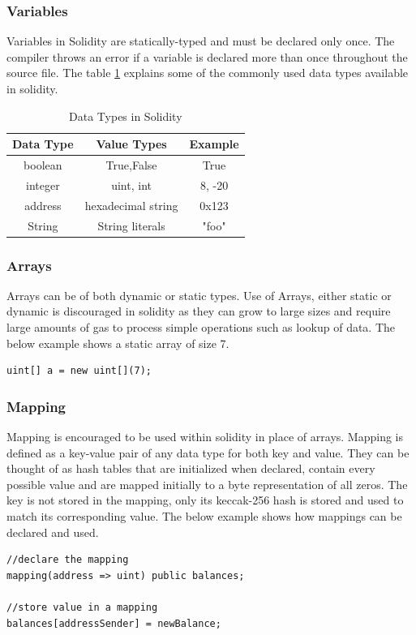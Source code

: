 \documentclass[11pt,openright]{report}
\begin{document}
\subsubsection{Variables}
Variables in Solidity are statically-typed and must be declared only once. The compiler throws an error if a variable is declared more than once throughout the source file. The table \ref{solidity_data_types} explains some of the commonly used data types available in solidity.
\newline
\newline
\begin{table}[!htbp]
    \renewcommand{\arraystretch}{1.3}
    \caption{Data Types in Solidity}
    \label{solidity_data_types}
    \centering
    \begin{tabular}{|c|c|c|}
        \hline
        \bfseries Data Type & \bfseries Value Types & \bfseries Example \\
        \hline\hline
        boolean & True,False & True \\ \hline
        integer & uint, int & 8, -20 \\ \hline
        address & hexadecimal string & 0x123 \\ \hline
        String & String literals & "foo" \\ \hline
    \end{tabular}
\end{table}
\newline
\newline

\subsubsection{Arrays}
Arrays can be of both dynamic or static types. Use of Arrays, either static or dynamic is discouraged in solidity as they can grow to large sizes and require large amounts of gas to process simple operations such as lookup of data. The below example shows a static array of size 7.
\begin{lstlisting}
uint[] a = new uint[](7);
\end{lstlisting}

\subsubsection{Mapping}
Mapping is encouraged to be used within solidity in place of arrays. Mapping is defined as a key-value pair of any data type for both key and value. They can be thought of as hash tables that are initialized when declared, contain every possible value and are mapped initially to a byte representation of all zeros. The key is not stored in the mapping, only its keccak-256 hash is stored and used to match its corresponding value. The below example shows how mappings can be declared and used.
\begin{lstlisting}
//declare the mapping
mapping(address => uint) public balances;

//store value in a mapping
balances[addressSender] = newBalance;
\end{lstlisting}
\end{document}
